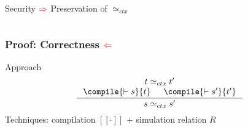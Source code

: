 \documentclass{beamer}
\let\oldinference\inference
\begin{document}
\begin{frame}
{\begin{columns}
\begin{column}{0.45\textwidth}
\begin{figure}
 	 \end{figure}
 	 \vspace{-1.5em}
    \begin{block}{Security ${\color{red}\Rightarrow}$}
Preservation of $\simeq_{ctx}$
	\end{block}
\end{column}
\end{columns}
}
\end{frame}
\begin{frame}
\frametitle{Proof: Correctness ${\color{red}\Leftarrow}$}
\begin{block}{Approach}
\begin{equation*}
\oldinference{
t\simeq_{ctx}t'\\
\compile{\vdash s}{t} & \compile{\vdash s'}{t'}\\
}{
s\simeq_{ctx}s'}
\end{equation*}
\center Techniques: compilation $[[\cdot]]$ + simulation relation $R$
\end{block}
\end{frame}
\end{document}
